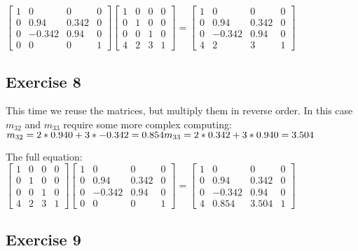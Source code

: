 \documentclass[11pt]{article}
\begin{document}
$
\begin{bmatrix}
1 & 0 & 0 & 0 \\
0 & 0.94 & 0.342 & 0 \\
0 & -0.342 & 0.94 & 0 \\
0 & 0 & 0 & 1
\end{bmatrix}
\begin{bmatrix}
1 & 0 & 0 & 0 \\
0 & 1 & 0 & 0 \\
0 & 0 & 1 & 0 \\
4 & 2 & 3 & 1
\end{bmatrix}
=
\begin{bmatrix}
1 & 0 & 0 & 0 \\
0 & 0.94 & 0.342 & 0 \\
0 & -0.342 & 0.94 & 0 \\
4 & 2 & 3 & 1
\end{bmatrix}
$

\subsection{Exercise 8}

This time we reuse the matrices, but multiply them in reverse order. In this case $m_{32}$ and $m_{33}$ require some more complex computing: \\
$
m_{32} = 2*0.940 + 3*-0.342 = 0.854 \\
m_{33} = 2*0.342 + 3*0.940 = 3.504
$

The full equation:
$
\begin{bmatrix}
1 & 0 & 0 & 0 \\
0 & 1 & 0 & 0 \\
0 & 0 & 1 & 0 \\
4 & 2 & 3 & 1
\end{bmatrix}
\begin{bmatrix}
1 & 0 & 0 & 0 \\
0 & 0.94 & 0.342 & 0 \\
0 & -0.342 & 0.94 & 0 \\
0 & 0 & 0 & 1
\end{bmatrix}=
\begin{bmatrix}
1 & 0 & 0 & 0 \\
0 & 0.94 & 0.342 & 0 \\
0 & -0.342 & 0.94 & 0 \\
4 & 0.854 & 3.504 & 1
\end{bmatrix}
$

\subsection{Exercise 9}
\end{document}
